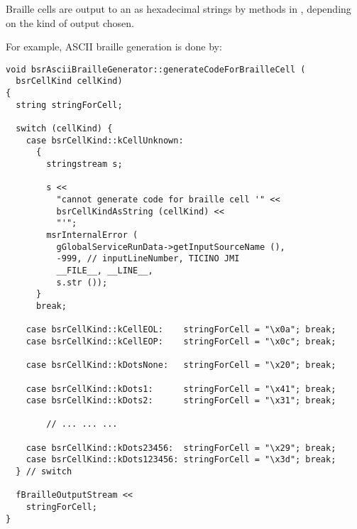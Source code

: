 Braille cells are output to an  as hexadecimal strings by  methods in , depending on the kind of output chosen.

For example, ASCII braille generation is done by:
\begin{lstlisting}[language=CPlusPlus]
void bsrAsciiBrailleGenerator::generateCodeForBrailleCell (
  bsrCellKind cellKind)
{
  string stringForCell;

  switch (cellKind) {
    case bsrCellKind::kCellUnknown:
      {
        stringstream s;

        s <<
          "cannot generate code for braille cell '" <<
          bsrCellKindAsString (cellKind) <<
          "'";
        msrInternalError (
          gGlobalServiceRunData->getInputSourceName (),
          -999, // inputLineNumber, TICINO JMI
          __FILE__, __LINE__,
          s.str ());
      }
      break;

    case bsrCellKind::kCellEOL:    stringForCell = "\x0a"; break;
    case bsrCellKind::kCellEOP:    stringForCell = "\x0c"; break;

    case bsrCellKind::kDotsNone:   stringForCell = "\x20"; break;

    case bsrCellKind::kDots1:      stringForCell = "\x41"; break;
    case bsrCellKind::kDots2:      stringForCell = "\x31"; break;

		// ... ... ...

    case bsrCellKind::kDots23456:  stringForCell = "\x29"; break;
    case bsrCellKind::kDots123456: stringForCell = "\x3d"; break;
  } // switch

  fBrailleOutputStream <<
    stringForCell;
}
\end{lstlisting}

